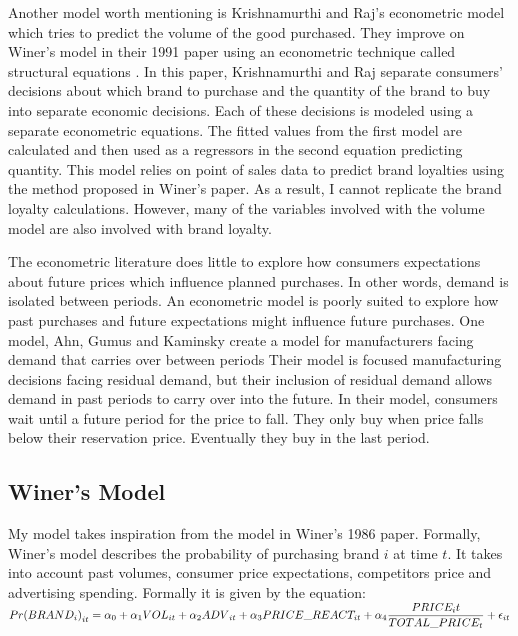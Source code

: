 \documentclass{article}
\begin{document}
Another model worth mentioning is Krishnamurthi and Raj's econometric model which tries to predict the volume of the good purchased. They improve on Winer's model in their 1991 paper using an econometric technique called structural equations \cite{krishnamurthi}.  In this paper, Krishnamurthi and Raj separate consumers' decisions about which brand to purchase and the quantity of the brand to buy into separate economic decisions. Each of these decisions is modeled using a separate econometric equations. The fitted values from the first model are calculated and then used as a regressors in the second equation predicting quantity. This model relies on point of sales data to predict brand loyalties using the method proposed in Winer's paper. As a result, I cannot replicate the brand loyalty calculations. However, many of the variables involved with the volume model are also involved with brand loyalty.

The econometric literature does little to explore how consumers expectations about future prices which influence planned purchases. In other words, demand is isolated between periods.  An econometric model is poorly suited to explore how past purchases and future expectations might influence future purchases. One model, Ahn, Gumus and Kaminsky create a model for manufacturers facing demand that carries over between periods \cite{ahn} Their model is focused manufacturing decisions facing residual demand, but their inclusion of residual demand allows demand in past periods to carry over into the future. In their model, consumers wait until a future period for the price to fall. They only buy when price falls below their reservation price. Eventually they buy in the last period.

\subsection{Winer's Model}
My model takes inspiration from the model in Winer's 1986 paper. Formally, Winer's model describes the probability of purchasing brand $i$ at time $t$. It takes into account past volumes,  consumer price expectations, competitors price and advertising spending. Formally it is given by the equation: \\

$ {Pr(BRAND_i)}_{it} = \alpha_0 + \alpha_1 {VOL}_{it} + \alpha_2 {ADV}_{it} +  \alpha_3 PRICE\_REACT_{it}  \medskip + \alpha_4 \dfrac{PRICE_it}{TOTAL\_PRICE_{t}} + \epsilon_{it}$\\
\end{document}
